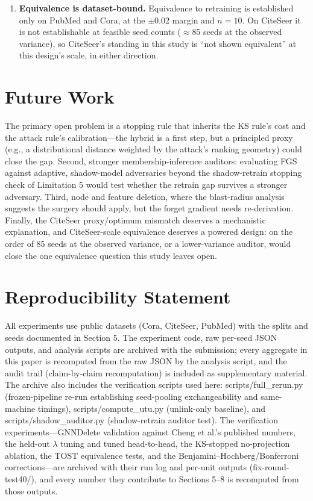 \documentclass[pdflatex,sn-basic,Numbered]{sn-jnl}
\begin{document}
\begin{enumerate}
\item \textbf{Equivalence is dataset-bound.} Equivalence to retraining is established only on PubMed and Cora, at the $\pm$0.02 margin and $n = 10$. On CiteSeer it is not establishable at feasible seed counts ($\approx$85 seeds at the observed variance), so CiteSeer's standing in this study is ``not shown equivalent'' at this design's scale, in either direction.
\end{enumerate}

\section{Future Work}
The primary open problem is a stopping rule that inherits the KS rule's cost and the attack rule's calibration---the hybrid is a first step, but a principled proxy (e.g., a distributional distance weighted by the attack's ranking geometry) could close the gap. Second, stronger membership-inference auditors: evaluating FGS against adaptive, shadow-model adversaries beyond the shadow-retrain stopping check of Limitation 5 would test whether the retrain gap survives a stronger adversary. Third, node and feature deletion, where the blast-radius analysis suggests the surgery should apply, but the forget gradient needs re-derivation. Finally, the CiteSeer proxy/optimum mismatch deserves a mechanistic explanation, and CiteSeer-scale equivalence deserves a powered design: on the order of 85 seeds at the observed variance, or a lower-variance auditor, would close the one equivalence question this study leaves open.

\section{Reproducibility Statement}
All experiments use public datasets (Cora, CiteSeer, PubMed) with the splits and seeds documented in Section 5. The experiment code, raw per-seed JSON outputs, and analysis scripts are archived with the submission; every aggregate in this paper is recomputed from the raw JSON by the analysis script, and the audit trail (claim-by-claim recomputation) is included as supplementary material. The archive also includes the verification scripts used here: scripts/full\_rerun.py (frozen-pipeline re-run establishing seed-pooling exchangeability and same-machine timings), scripts/compute\_utu.py (unlink-only baseline), and scripts/shadow\_auditor.py (shadow-retrain auditor test). The verification experiments---GNNDelete validation against Cheng et al.'s published numbers, the held-out $\lambda$ tuning and tuned head-to-head, the KS-stopped no-projection ablation, the TOST equivalence tests, and the Benjamini--Hochberg/Bonferroni corrections---are archived with their run log and per-unit outputs (fix-round-test40/), and every number they contribute to Sections 5--8 is recomputed from those outputs.
\end{document}
